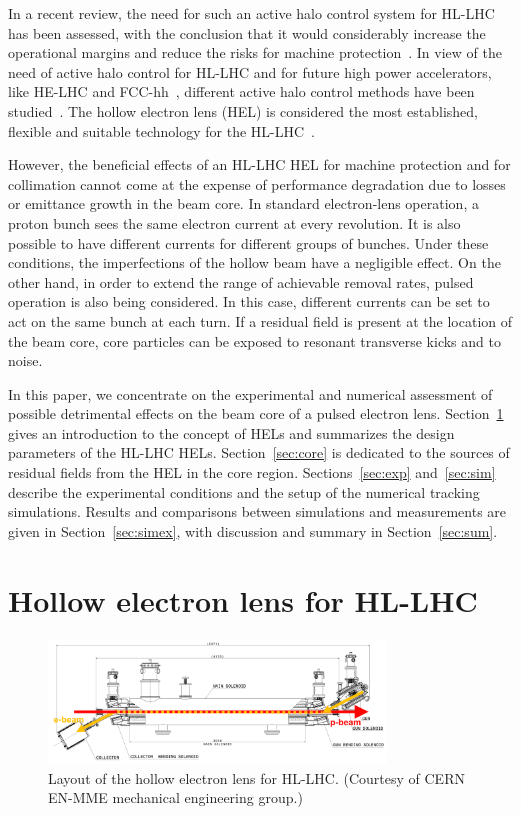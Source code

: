 \documentclass[aps
,prstab
,reprint
,longbibliography
,preprintnumbers
,showkeys
,amsfonts,amssymb,amsmath
,floatfix
]{revtex4-1}
\begin{document}
In a recent review, the need for such an active halo control system
for HL-LHC has been assessed, with the conclusion that it would
considerably increase the operational margins and reduce the risks for
machine protection~\cite{helreview}. In view of the need of active
halo control for HL-LHC and for future high power accelerators, like
HE-LHC and FCC-hh~\cite{helhcparam2011, fcc_coll_ipac2017}, different
active halo control methods have been
studied~\cite{helreview_bruce}. The hollow electron lens (HEL) is
considered the most established, flexible and suitable technology for
the HL-LHC~\cite{hel_tevatron_stancari, helreview}.

However, the beneficial effects of an HL-LHC HEL for machine
protection and for collimation cannot come at the expense of
performance degradation due to losses or emittance growth in the beam
core. In standard electron-lens operation, a proton bunch sees the
same electron current at every revolution. It is also possible to have
different currents for different groups of bunches. Under these
conditions, the imperfections of the hollow beam have a negligible
effect. On the other hand, in order to extend the range of achievable
removal rates, pulsed operation is also being considered. In this
case, different currents can be set to act on the same bunch at each
turn. If a residual field is present at the location of the beam core,
core particles can be exposed to resonant transverse kicks and to
noise.

In this paper, we concentrate on the experimental and numerical
assessment of possible detrimental effects on the beam core of a
pulsed electron lens. Section~\ref{sec:hel} gives an introduction to
the concept of HELs and summarizes the design parameters of the HL-LHC
HELs. Section~\ref{sec:core} is dedicated to the sources of residual
fields from the HEL in the core region. Sections~\ref{sec:exp}
and~\ref{sec:sim} describe the experimental conditions and the setup
of the numerical tracking simulations. Results and comparisons between
simulations and measurements are given in Section~\ref{sec:simex},
with discussion and summary in Section~\ref{sec:sum}.



\section{Hollow electron lens for HL-LHC}
\label{sec:hel}

\begin{figure}
  \includegraphics[width=0.8\textwidth]{hel_layout_epbeam}
  \caption{Layout of the hollow electron lens for HL-LHC. (Courtesy of
    CERN EN-MME mechanical engineering group.)}
  \label{fig:hel_layout}
\end{figure}
\end{document}
